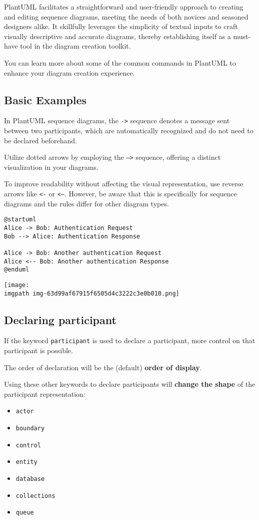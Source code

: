 PlantUML facilitates a straightforward and user-friendly approach to creating and editing sequence diagrams, meeting the needs of both novices and seasoned designers alike. It skillfully leverages the simplicity of textual inputs to craft visually descriptive and accurate diagrams, thereby establishing itself as a must-have tool in the diagram creation toolkit.


You can learn more about some of the common commands in PlantUML to enhance your diagram creation experience.
%
%
\subsection{Basic Examples}


In PlantUML sequence diagrams, the \texttt{->} sequence denotes a message sent between two participants, which are automatically recognized and do not need to be declared beforehand.


Utilize dotted arrows by employing the \texttt{-->} sequence, offering a distinct visualization in your diagrams.


To improve readability without affecting the visual representation, use reverse arrows like \texttt{<-} or \texttt{<--}. However, be aware that this is specifically for sequence diagrams and the rules differ for other diagram types.




\begin{verbatim}
@startuml
Alice -> Bob: Authentication Request
Bob --> Alice: Authentication Response

Alice -> Bob: Another authentication Request
Alice <-- Bob: Another authentication Response
@enduml
\end{verbatim}
\begin{center}
\texttt{[image: \\imgpath img-63d99af67915f6505d4c3222c3e0b010.png]}
\end{center}
%
%
\subsection{Declaring participant}


If the keyword \texttt{participant} is used to declare a participant, more control on that participant is possible.


The order of declaration will be the (default) \textbf{order of display}.


Using these other keywords to declare participants will \textbf{change the shape} of the participant representation:
\begin{itemize}
\item \texttt{actor}
\item \texttt{boundary}
\item \texttt{control}
\item \texttt{entity}
\item \texttt{database}
\item \texttt{collections}
\item \texttt{queue}
\end{itemize}



